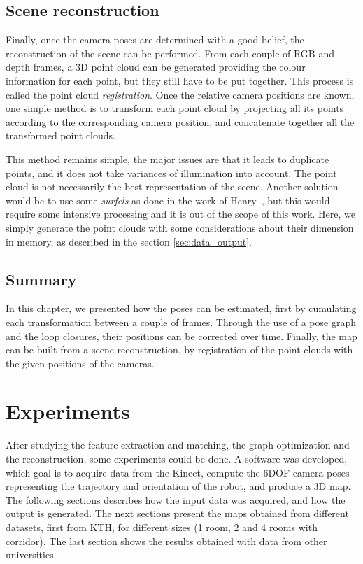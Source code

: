 \section{Scene reconstruction}

Finally, once the camera poses are determined with a good belief, the reconstruction of the scene can be performed. From each couple of RGB and depth frames, a 3D point cloud can be generated providing the colour information for each point, but they still have to be put together. This process is called the point cloud \emph{registration}. Once the relative camera positions are known, one simple method is to transform each point cloud by projecting all its points according to the corresponding camera position, and concatenate together all the transformed point clouds.

This method remains simple, the major issues are that it leads to duplicate points, and it does not take variances of illumination into account. The point cloud is not necessarily the best representation of the scene. Another solution would be to use some \emph{surfels} as done in the work of Henry~\cite{Henry_RGBD_2010}, but this would require some intensive processing and it is out of the scope of this work. Here, we simply generate the point clouds with some considerations about their dimension in memory, as described in the section \ref{sec:data_output}.

\section{Summary}

In this chapter, we presented how the poses can be estimated, first by cumulating each transformation between a couple of frames. Through the use of a pose graph and the loop closures, their positions can be corrected over time. Finally, the map can be built from a scene reconstruction, by registration of the point clouds with the given positions of the cameras.

\chapter{Experiments}
\label{chap:experiments}

After studying the feature extraction and matching, the graph optimization and the reconstruction, some experiments could be done. A software was developed, which goal is to acquire data from the Kinect, compute the 6\gls{DOF} camera poses representing the trajectory and orientation of the robot, and produce a 3D map. The following sections describes how the input data was acquired, and how the output is generated. The next sections present the maps obtained from different datasets, first from KTH, for different sizes (1 room, 2 and 4 rooms with corridor). The last section shows the results obtained with data from other universities.


